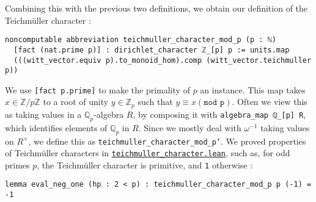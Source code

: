 \documentclass[a4paper,UKenglish,cleveref, autoref, thm-restate]{lipics-v2021}
\newcommand{\lean}[1]{\texttt{#1}\xspace} %
\begin{document}
Combining this with the previous two definitions, we obtain our definition of the Teichmüller character : 
\begin{lstlisting}
noncomputable abbreviation teichmuller_character_mod_p (p : ℕ) 
  [fact (nat.prime p)] : dirichlet_character ℤ_[p] p := units.map 
  (((witt_vector.equiv p).to_monoid_hom).comp (witt_vector.teichmuller p))
\end{lstlisting}
We use \lean{[fact p.prime]} to make the primality of $p$ an instance. This map takes $x \in \mathbb{Z}/p\mathbb{Z}$ to a root of unity $y \in \mathbb{Z}_p$ such that $y \equiv x (\texttt{mod p})$. 
Often we view this as taking values in a $\mathbb{Q}_p$-algebra $R$, by composing it 
with \lean{algebra\_map ℚ\_[p] R}, which identifies elements of $\mathbb{Q}_p$ 
in $R$. Since we mostly deal with $\omega ^{-1}$ taking values on $R^{\times}$, we define this as \lean{teichmuller\_character\_mod\_p'}. \newline
We proved properties of Teichmüller characters in \href{https://github.com/laughinggas/p-adic-L-functions/blob/main/src/dirichlet_character/teichmuller_character.lean}{\lean{teichmuller\_character.lean}}, 
such as, for odd primes $p$, the Teichmüller character is primitive, and \lean{1} otherwise : 
\begin{lstlisting}
lemma eval_neg_one (hp : 2 < p) : teichmuller_character_mod_p p (-1) = -1
\end{lstlisting}
\end{document}
